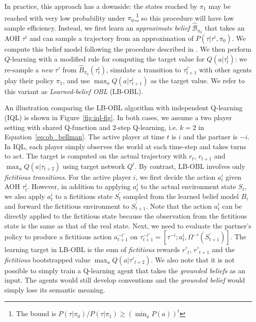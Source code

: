 In practice, this approach has a downside: the states reached by $\pi_1$ may be reached with very low probability under $\pi_0$,\footnote{The bound is $P(\tau|\pi_0)/P(\tau|\pi_1) \geq (\min_a P(a))^t$} so this procedure will have low sample efficiency. Instead, we first learn an \textit{approximate belief} $\hat{\mathcal{B}}_{\pi_0}$ that takes an AOH $\tau^i$ and can sample a trajectory from an approximation of $P(\tau|\tau^i,\pi_0)$. We compute this belief model following the procedure described in \citet{hu2021learned}. We then perform $Q$-learning with a modified rule for computing the target value for $Q(a|\tau_t^i)$: we re-sample a \textit{new} $\tau'$ from $\hat{B}_{\pi_0}(\tau_t^i)$, simulate a transition to $\tau_{t+1}^{i'}$ with other agents play their policy $\pi_1$, and use $\max_a Q(a|\tau_{t+1}^i)$ as the target value. We refer to this variant as \textit{Learned-belief OBL} (LB-OBL).

An illustration comparing the LB-OBL algorithm with independent Q-learning (IQL) is shown in Figure~\ref{fig:iql-fig}. In both cases, we assume a two player setting with shared Q-function and 2-step Q-learning, i.e. $k=2$ in Equation~\ref{eq:ob_bellman}. The active player at time $t$ is $i$ and the partner is $-i$. In IQL, each player simply observes the world at each time-step and takes turns to act. The target is computed on the actual trajectory with $r_t$, $r_{t+1}$ and $\max_{a}Q(a|\tau_{t+2})$ using target network $Q^{i}$. By contrast, LB-OBL involves only \emph{fictitious transitions}. For the active player $i$, we first decide the action $a_t^{i}$ given AOH $\tau_t^i$. However, in addition to applying $a_t^{i}$ to the actual environment state $S_t$, we also apply $a_t^{i}$ to a fictitious state $S^{\prime}_{t}$ sampled from the learned belief model $B_i$ and forward the fictitious environment to $S^{\prime}_{t+1}$. Note that the action $a_t^i$ can be directly applied to the fictitious state because the observation from the fictitious state is the same as that of the real state. Next, we need to evaluate the partner's policy to produce a fictitious action $a^{-i\prime}_{t+1}$ on $\tau^{-i\prime}_{t+1} = [\tau^{-i}; a^{i}_t, \Omega^{-i}(S^{\prime}_{t+1})]$. The learning target in LB-OBL is the sum of \emph{fictitious} rewards $r'_{t}$, $r'_{t+1}$ and the \emph{fictitious} bootstrapped value $\max_{a}Q(a|\tau'_{t+2})$. We also note that it is not possible to simply train a Q-learning agent that takes the \emph{grounded beliefs} as an input. The agents would still develop conventions and the \emph{grounded belief} would simply lose its semantic meaning. 
